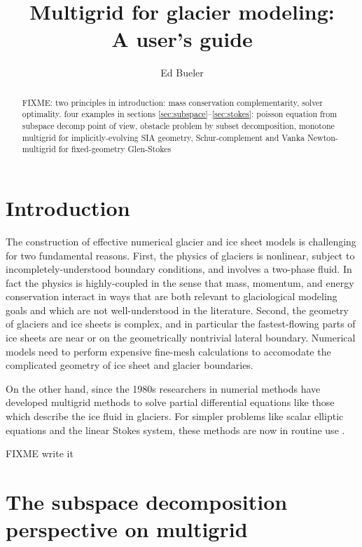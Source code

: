 \documentclass[letterpaper,final,12pt,reqno]{amsart}
\begin{document}
\title[Multigrid for glacier modeling]{Multigrid for glacier modeling: \\ A user's guide}

\author{Ed Bueler}

\begin{abstract} FIXME: two principles in introduction: mass conservation complementarity, solver optimality.  four examples in sections \ref{sec:subspace}--\ref{sec:stokes}: poisson equation from subspace decomp point of view, obstacle problem by subset decomposition, monotone multigrid for implicitly-evolving SIA geometry, Schur-complement and Vanka Newton-multigrid for fixed-geometry Glen-Stokes
\end{abstract}

\maketitle

\thispagestyle{empty}
\bigskip

\section{Introduction} \label{sec:intro}

The construction of effective numerical glacier and ice sheet models is challenging for two fundamental reasons.  First, the physics of glaciers is nonlinear, subject to incompletely-understood boundary conditions, and involves a two-phase fluid.  In fact the physics is highly-coupled in the sense that mass, momentum, and energy conservation interact in ways that are both relevant to glaciological modeling goals and which are not well-understood in the literature.  Second, the geometry of glaciers and ice sheets is complex, and in particular the fastest-flowing parts of ice sheets are near or on the geometrically nontrivial lateral boundary.  Numerical models need to perform expensive fine-mesh calculations to accomodate the complicated geometry of ice sheet and glacier boundaries.

On the other hand, since the 1980s researchers in numerial methods have developed multigrid methods to solve partial differential equations like those which describe the ice fluid in glaciers.   For simpler problems like scalar elliptic equations and the linear Stokes system, these methods are now in routine use \cite{Briggsetal2000,Bueler2021,Trottenbergetal2001}.

FIXME write it


\section{The subspace decomposition perspective on multigrid} \label{sec:subspace}
\end{document}
